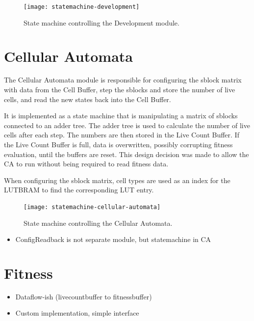\begin{figure}[!ht]
    \centering
    \texttt{[image: statemachine-development]}
    \caption{State machine controlling the Development module.}
    \label{fig:statemachine-development}
\end{figure}

\section{Cellular Automata}

The Cellular Automata module is responsible for configuring the sblock matrix with data from the Cell Buffer, step the sblocks and store the number of live cells, and read the new states back into the Cell Buffer.

It is implemented as a state machine that is manipulating a matrix of sblocks connected to an adder tree.
The adder tree is used to calculate the number of live cells after each step.
The numbers are then stored in the Live Count Buffer.
If the Live Count Buffer is full, data is overwritten, possibly corrupting fitness evaluation, until the buffers are reset.
This design decision was made to allow the CA to run without being required to read fitness data.

When configuring the sblock matrix, cell types are used as an index for the LUTBRAM to find the corresponding LUT entry.

\begin{figure}[!ht]
    \centering
    \texttt{[image: statemachine-cellular-automata]}
    \caption{State machine controlling the Cellular Automata.}
    \label{fig:statemachine-cellular-automata}
\end{figure}

\begin{itemize}
    \item ConfigReadback is not separate module, but statemachine in CA
\end{itemize}

\section{Fitness}

\begin{itemize}
    \item Dataflow-ish (livecountbuffer to fitnessbuffer)
    \item Custom implementation, simple interface
\end{itemize}

